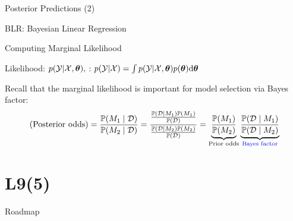 \documentclass[handout,fleqn,aspectratio=169]{beamer}
\begin{document}
\begin{frame}{Posterior Predictions (2)}


\bci
\item BLR: Bayesian Linear Regression
\eci
\end{frame}


\begin{frame}{Computing Marginal Likelihood}

\plitemsep 0.07in

\bci 

\item Likelihood: $p({\cal Y} | {\cal X}, \bm{\theta}),$ : $p({\cal Y} | {\cal X}) = \int p({\cal Y} | {\cal X},\bm{\theta})p(\bm{\theta})\text{d}\bm{\theta}$

\item Recall that the marginal likelihood is important for model selection via Bayes factor: 
$$
\text{(Posterior odds)} = \frac{\mathbb{P}( M_1 \mid \mathcal D )}{\mathbb{P}( M_2 \mid \mathcal D )} = \frac
{
\frac{\mathbb{P}( \mathcal D \mid M_1 )\mathbb{P}( M_1 )}{\mathbb{P}( \mathcal D )}
}
{
\frac{\mathbb{P}( \mathcal D \mid M_2 )\mathbb{P}( M_2 )}{\mathbb{P}( \mathcal D )}
}
= \underbrace{\frac{\mathbb{P}( M_1 )}{\mathbb{P}( M_2 )}}_{\text{Prior odds}} 
\underbrace{\frac{\mathbb{P}( \mathcal D \mid M_1 )}{\mathbb{P}( \mathcal D \mid M_2 )}}_{{\color{blue} \text{Bayes factor}}}
$$

\item[] 
\eci
\end{frame}


\section{L9(5)}
\begin{frame}{Roadmap}

\plitemsep 0.1in

\bce[(1)] 

\item  {}
\item  {} 
\item  {} 
\item  {} 
\item  {}

\ece
\end{frame}
\end{document}

